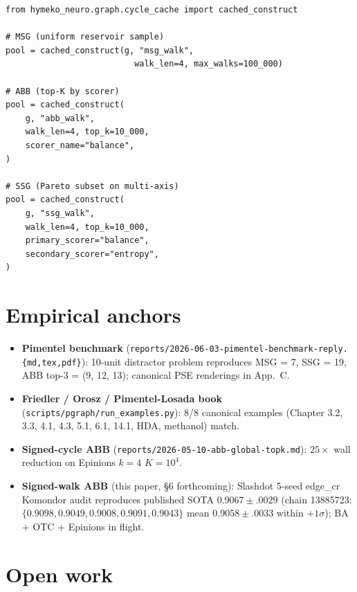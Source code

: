 \documentclass[11pt]{article}
\begin{document}
\begin{lstlisting}[style=pythonstyle]
from hymeko_neuro.graph.cycle_cache import cached_construct

# MSG (uniform reservoir sample)
pool = cached_construct(g, "msg_walk",
                          walk_len=4, max_walks=100_000)

# ABB (top-K by scorer)
pool = cached_construct(
    g, "abb_walk",
    walk_len=4, top_k=10_000,
    scorer_name="balance",
)

# SSG (Pareto subset on multi-axis)
pool = cached_construct(
    g, "ssg_walk",
    walk_len=4, top_k=10_000,
    primary_scorer="balance",
    secondary_scorer="entropy",
)
\end{lstlisting}

\section{Empirical anchors}

\begin{itemize}[leftmargin=2em,itemsep=0pt]
  \item \textbf{Pimentel benchmark}
        (\texttt{reports/2026-06-03-pimentel-benchmark-reply.\{md,tex,pdf\}}):
        10-unit distractor problem reproduces MSG = 7, SSG = 19,
        ABB top-3 = (9, 12, 13); canonical PSE renderings in App.~C.
  \item \textbf{Friedler / Orosz / Pimentel-Losada book}
        (\texttt{scripts/pgraph/run\_examples.py}):
        8/8 canonical examples (Chapter 3.2, 3.3, 4.1, 4.3, 5.1, 6.1,
        14.1, HDA, methanol) match.
  \item \textbf{Signed-cycle ABB}
        (\texttt{reports/2026-05-10-abb-global-topk.md}):
        $25\times$ wall reduction on Epinions $k=4$ $K=10^4$.
  \item \textbf{Signed-walk ABB} (this paper, \S6 forthcoming):
        Slashdot 5-seed edge\_cr Komondor audit reproduces published
        SOTA $0.9067 \pm .0029$ (chain 13885723: $\{0.9098, 0.9049,
        0.9008, 0.9091, 0.9043\}$ mean $0.9058 \pm .0033$ within
        $+1\sigma$); BA + OTC + Epinions in flight.
\end{itemize}

\section{Open work}
\end{document}
